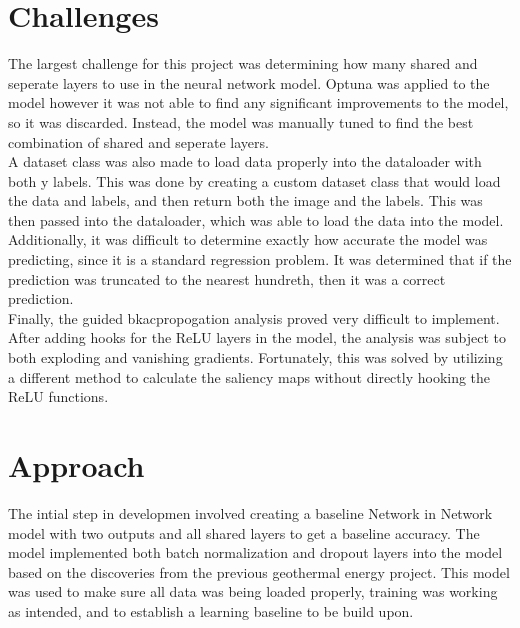 \documentclass{article}[12pt]
\begin{document}
\section*{Challenges}

The largest challenge for this project was determining how many shared and seperate layers to use in the neural network model. Optuna was applied to the model however it was not able to find any significant improvements to the model, so it was discarded. Instead, the model was manually tuned to find the best combination of shared and seperate layers.\\
\indent
A dataset class was also made to load data properly into the dataloader with both y labels. This was done by creating a custom dataset class that would load the data and labels, and then return both the image and the labels. This was then passed into the dataloader, which was able to load the data into the model.\\
\indent
Additionally, it was difficult to determine exactly how accurate the model was predicting, since it is a standard regression problem. It was determined that if the prediction was truncated to the nearest hundreth, then it was a correct prediction.\\
\indent
Finally, the guided bkacpropogation analysis proved very difficult to implement. After adding hooks for the ReLU layers in the model, the analysis was subject to both exploding and vanishing gradients. Fortunately, this was solved by utilizing a different method to calculate the saliency maps without directly hooking the ReLU functions. \cite{saliency}

\section*{Approach}

The intial step in developmen involved creating a baseline Network in Network model with two outputs and all shared layers to get a baseline accuracy. The model implemented both batch normalization and dropout layers into the model based on the discoveries from the previous geothermal energy project. This model was used to make sure all data was being loaded properly, training was working as intended, and to establish a learning baseline to be build upon.\\
\end{document}
